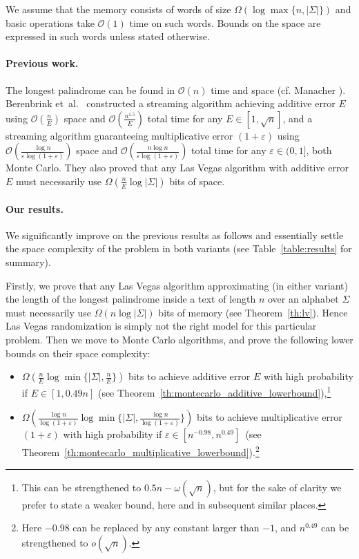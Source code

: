 \documentclass{article}[11pt,letter]
\newcommand{\bigo}{\mathcal{O}}
\newcommand{\aerr}{\ensuremath{E}}
\newcommand{\etal}{et~al.}
\begin{document}
We assume that the memory consists of words of size $\Omega(\log\max\{n,|\Sigma|\})$ and
basic operations take $\bigo(1)$ time on such words. Bounds on the space are expressed in such words unless stated otherwise.

\paragraph{Previous work.} The longest palindrome can be found in $\bigo(n)$ time and space (cf. Manacher \cite{Manacher}).
Berenbrink \etal~\cite{Berenbrink} constructed a streaming algorithm
achieving additive error $\aerr$ using $\bigo(\frac{n}{\aerr})$ space and $\bigo(\frac{n^{1.5}}{\aerr})$ total time
for any $\aerr \in [1,\sqrt{n}]$,
and a streaming algorithm guaranteeing multiplicative error $(1+\varepsilon)$ using $\bigo(\frac{\log n}{\varepsilon \log(1+\varepsilon)})$
space and $\bigo(\frac{n \log n}{\varepsilon \log(1+\varepsilon)})$ total time for any $\varepsilon \in (0,1]$,
both Monte Carlo.
They also proved that any Las Vegas algorithm with additive error $\aerr$ must necessarily use
$\Omega(\frac{n}{\aerr}\log|\Sigma|)$ bits of space.

\paragraph{Our results.} We significantly improve on the previous results as follows and essentially settle the space complexity of the
problem in both variants (see Table~\ref{table:results} for summary).

Firstly, we prove that any Las Vegas algorithm approximating (in either variant) the length of the longest palindrome inside a text of length $n$
over an alphabet $\Sigma$ must necessarily use $\Omega(n\log|\Sigma|)$ bits of memory (see Theorem~\ref{th:lv}).
Hence Las Vegas randomization is simply not the right model for this particular problem.
Then we move to Monte Carlo algorithms, and prove the following lower bounds on their space complexity:
\begin{itemize}
\item $\Omega(\frac{n}{\aerr} \log \min \{|\Sigma|,\frac{n}{\aerr}\} )$ bits to achieve additive error $\aerr$ with high probability if $\aerr \in [1,0.49 n]$ (see Theorem~\ref{th:montecarlo_additive_lowerbound}),\footnote{This can be strengthened to $0.5n - \omega(\sqrt{n})$, but for the sake of clarity we prefer to state a weaker bound, here and in subsequent similar places.}
\item $\Omega(\frac{\log n}{\log(1+\varepsilon)}\log \min \{|\Sigma|,\frac{\log n}{\log(1+\varepsilon)}\})$ bits to achieve multiplicative error $(1+\varepsilon)$ with high probability if $\varepsilon \in [n^{-0.98}, n^{0.49}]$\  (see Theorem~\ref{th:montecarlo_multiplicative_lowerbound}).\footnote{Here $-0.98$ can be replaced by any constant larger than $-1$, and $n^{0.49}$ can be strengthened to $o(\sqrt{n})$.}
\end{itemize}
\end{document}
